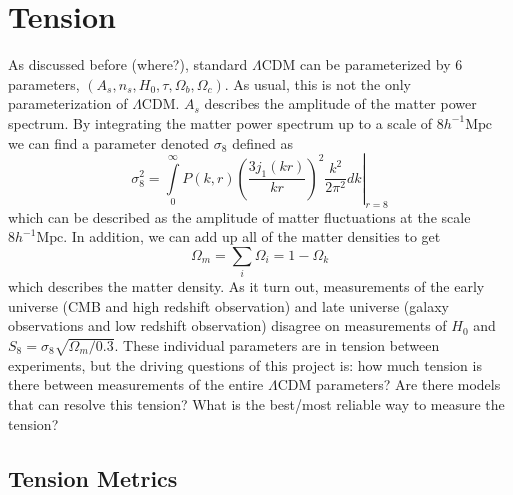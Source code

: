 \chapter{Tension}
As discussed before (where?), standard $\Lambda$CDM can be parameterized by 6 parameters, $(A_s,n_s,H_0,\tau,\Omega_b,\Omega_c)$. As usual, this is not the only parameterization of $\Lambda$CDM. $A_s$ describes the amplitude of the matter power spectrum. By integrating the matter power spectrum up to a scale of $8 h^{-1}\mathrm{Mpc}$ we can find a parameter denoted $\sigma_8$ defined as
\begin{equation}
\sigma_8^2 = \left.\int\limits_0^\infty P(k,r)\left(\frac{3j_1(kr)}{kr}\right)^2\frac{k^2}{2\pi^2}dk\right|_{r=8}
\end{equation}
which can be described as the amplitude of matter fluctuations at the scale $8 h^{-1}\mathrm{Mpc}$. In addition, we can add up all of the matter densities to get
\begin{equation}
\Omega_m = \sum_i \Omega_i = 1-\Omega_k
\end{equation}
which describes the matter density. As it turn out, measurements of the early universe (CMB and high redshift observation) and late universe (galaxy observations and low redshift observation) disagree on measurements of $H_0$ and $S_8 = \sigma_8\sqrt{\Omega_m/0.3}$. These individual parameters are in tension between experiments, but the driving questions of this project is: how much tension is there between measurements of the entire $\Lambda$CDM parameters? Are there models that can resolve this tension? What is the best/most reliable way to measure the tension?

\section{Tension Metrics}

